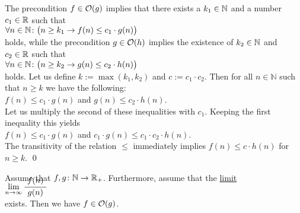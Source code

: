 \proof
The precondition $f \in \mathcal{O}(g)$ implies that there exists a $k_1 \in {\mathbb N}$ and a number $c_1 \in {\mathbb R}$
such that 
\\[0.2cm]
\hspace*{1.3cm} 
$\forall n \in {\mathbb N} \colon\bigl( n \geq k_1 \rightarrow f(n) \leq c_1 \cdot g(n)\bigr)$ 
\\[0.2cm]
holds, while the precondition $g \in \mathcal{O}(h)$ implies the existence of $k_2 \in {\mathbb N}$ and $c_2 \in {\mathbb R}$
such that \\[0.2cm]
\hspace*{1.3cm} 
$\forall n \in {\mathbb N} \colon\bigl( n \geq k_2 \rightarrow g(n) \leq c_2 \cdot h(n)\bigr)$ 
\\[0.2cm]
holds.  Let us define $k:= \max(k_1,k_2)$ and $c := c_1 \cdot c_2$.  Then for all $n \in \mathbb{N}$
such that $n \geq k$ we have the following:
\\[0.2cm]
\hspace*{1.3cm}
$f(n) \leq c_1\cdot g(n)$ \quad and \quad $g(n) \leq c_2 \cdot h(n)$. 
\\[0.2cm]
Let us multiply the second of these inequalities with $c_1$.  Keeping the first inequality this yields
\\[0.2cm]
\hspace*{1.3cm}
$f(n) \leq c_1\cdot g(n)$  \quad and \quad $c_1\cdot g(n) \leq c_1\cdot c_2 \cdot h(n)$. 
\\[0.2cm]
The transitivity of the relation $\leq$ immediately implies $f(n) \leq c \cdot h(n)$ for $n \geq k$.  
\qed

\begin{Proposition}  \label{limit}
  Assume that $f,g \colon {\mathbb N} \rightarrow {{\mathbb R}_+}$.   Furthermore, assume that the \href{https://en.wikipedia.org/wiki/Limit_(mathematics)#Limit_of_a_sequence}{limit}
  \\[0.2cm]
  \hspace*{3.3cm}
 $\lim\limits_{n \rightarrow \infty} \bruch{\,f(n)\,}{g(n)}$
  \\[0.2cm]
  exists.  Then we have $f \in \mathcal{O}(g)$. 
\end{Proposition}

